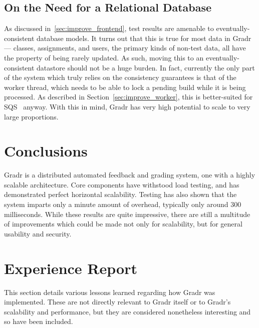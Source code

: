 \documentclass{scrartcl}
\begin{document}
\subsection{On the Need for a Relational Database}
As discussed in~\ref{sec:improve_frontend}, test results are amenable to eventually-consistent database models.
It turns out that this is true for most data in Gradr --- classes, assignments, and users, the primary kinds of non-test data, all have the property of being rarely updated.
As such, moving this to an eventually-consistent datastore should not be a huge burden.
In fact, currently the only part of the system which truly relies on the consistency guarantees is that of the worker thread, which needs to be able to lock a pending build while it is being processed.
As described in Section~\ref{sec:improve_worker}, this is better-suited for SQS~\cite{sqs} anyway.
With this in mind, Gradr has very high potential to scale to very large proportions.

\section{Conclusions}

Gradr is a distributed automated feedback and grading system, one with a highly scalable architecture.
Core components have withstood load testing, and has demonstrated perfect horizontal scalability.
Testing has also shown that the system imparts only a minute amount of overhead, typically only around 300 milliseconds.
While these results are quite impressive, there are still a multitude of improvements which could be made not only for scalability, but for general usability and security.

\appendix

\section{Experience Report}

This section details various lessons learned regarding how Gradr was implemented.
These are not directly relevant to Gradr itself or to Gradr's scalability and performance, but they are considered nonetheless interesting and so have been included.
\end{document}
